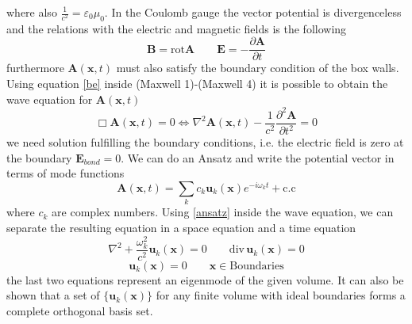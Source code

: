 \documentclass[12pt]{article}
\theoremstyle{plain}
\newcommand{\x}{\mathbf{x}}
\theoremstyle{definition}
\theoremstyle{remark}
\begin{document}
where also $\frac{1}{c^2} = \varepsilon_0\mu_0$. In the Coulomb gauge the vector potential is divergenceless and the relations with the electric and magnetic fields is the following
\begin{equation}\label{be}\mathbf{B} = \text{rot}\mathbf{A} \qquad \mathbf{E} = -\frac{\partial \mathbf{A}}{\partial t} \end{equation}
furthermore $\mathbf{A}(\x,t)$ must also satisfy the boundary condition of the box walls. Using equation \eqref{be} inside (Maxwell 1)-(Maxwell 4) it is possible to obtain the wave equation for $\mathbf{A}(\x,t)$
\begin{equation}\Box \mathbf{A}(\x,t) = 0 \iff \nabla^2 \mathbf{A}(\x,t)-\frac{1}{c^2}\frac{\partial^2\mathbf{A}}{\partial t^2} = 0\end{equation}
we need solution fulfilling the boundary conditions, i.e. the electric field is zero at the boundary $\mathbf{E}_{bond} = 0$. We can do an Ansatz and write the potential vector in terms of mode functions
\begin{equation}\label{ansatz}\mathbf{A}(\x,t) = \sum_k c_k \mathbf{u}_k(\x) e^{-i\omega_k t} + \text{c.c}\end{equation}
where $c_k$ are complex numbers. Using \eqref{ansatz} inside the wave equation, we can separate the resulting equation in a space equation and a time equation
\begin{equation}\nabla^2 + \frac{\omega_k^2}{c^2}\mathbf{u}_k(\x)  = 0 \qquad \text{div}\,\mathbf{u}_k(\x) = 0\end{equation}
\begin{equation}\mathbf{u}_k(\x) = 0 \qquad \x \in \text{Boundaries}\end{equation}
the last two equations represent an eigenmode of the given volume. It can also be shown that a set of $\{\mathbf{u}_k(\x) \}$ for any finite volume with ideal boundaries forms a complete orthogonal basis set.
\end{document}
